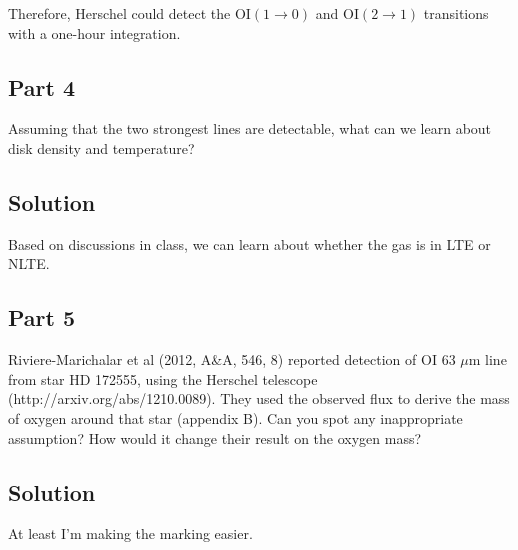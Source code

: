 \documentclass[12pt]{article}
\begin{document}
Therefore, Herschel could detect the $\mathrm{OI}(1\rightarrow0)$ and $\mathrm{OI}(2\rightarrow1)$ transitions with a one-hour integration.


\subsection*{Part 4}

Assuming that the two strongest lines are detectable, what can we learn about disk density and temperature?


\subsection*{Solution}

Based on discussions in class, we can learn about whether the gas is in LTE or NLTE.


\subsection*{Part 5}

Riviere-Marichalar et al (2012, A&A, 546, 8) reported detection of $\mathrm{OI}$ 63 $\mu$m line from star HD 172555, using the Herschel telescope (http://arxiv.org/abs/1210.0089). They used the observed flux to derive the mass of oxygen around that star (appendix B). Can you spot any inappropriate assumption? How would it change their result on the oxygen mass?


\subsection*{Solution}

At least I'm making the marking easier.
\end{document}
